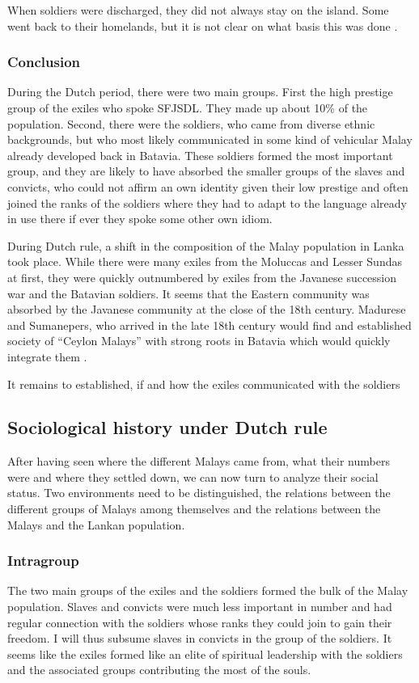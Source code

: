 When soldiers were discharged, they did not always stay on the island. Some went back to their homelands, but it is not clear on what basis this was done \citep[54]{Hussainmiya1987}.

\subsubsection{Conclusion}\label{sec:slmbg:dutch:demographic:Conclusion}
During the Dutch period, there were two main groups. First the high prestige group of the exiles who spoke SFJSDL. They made up about 10\% of the population. Second, there were the soldiers, who came from diverse ethnic backgrounds, but who most likely communicated in some kind of vehicular Malay already developed back in Batavia. These soldiers formed the most important group, and they are likely to have absorbed the smaller groups of the slaves and convicts, who could not affirm an own identity given their low prestige and often joined the ranks of the soldiers where they had to adapt to the language already in use there if ever they spoke some other own idiom.

During Dutch rule, a shift in the composition of the Malay population in Lanka took place. While there were many exiles from the Moluccas and Lesser Sundas at first, they were quickly outnumbered by exiles from the Javanese succession war and the Batavian soldiers. It seems that the Eastern community was absorbed by the Javanese community at the close of the 18th century.  Madurese and Sumanepers, who arrived in the late 18th century would find and established society of ``Ceylon Malays'' with strong roots in Batavia which would quickly integrate them \citep[55-57]{Hussainmiya1987}.

It remains to established, if and how the exiles communicated with the soldiers \kuckn

\subsection{Sociological history under Dutch rule}\label{sec:slmbg:SociologicalhistoryunderDutchrule}
After having seen where the different Malays came from, what their numbers were and where they settled down, we can now turn to analyze their social status. Two environments need to be distinguished, the relations between the different groups of Malays among themselves and the relations between the Malays and the Lankan population.

\subsubsection{Intragroup}\label{sec:slmbg:Intragroup}
The two main groups of the exiles and the soldiers formed the bulk of the Malay population. Slaves and convicts were much less important in number and had regular connection with the soldiers whose ranks they could join to gain their freedom. I will thus subsume slaves in convicts in the group of the soldiers. It seems like the exiles formed like an elite of spiritual leadership with the soldiers and the associated groups contributing the most of the souls.


